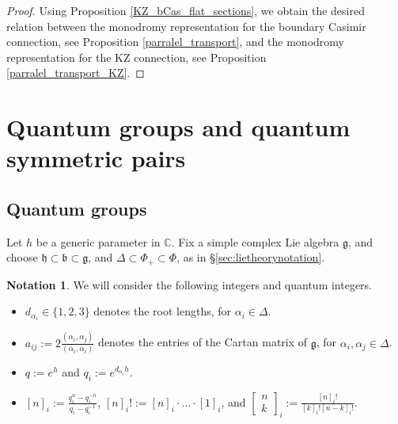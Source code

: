 \documentclass[10pt]{amsart}
\numberwithin{equation}{section}
\theoremstyle{definition}
\newtheorem{notation}[theorem]{Notation}
\def\C{{\mathbb C}}
\newcommand{\qbinom}[2]{\begin{bmatrix} #1 \\ #2 \end{bmatrix}}
\newcommand{\g}{\mathfrak{g}}
\newcommand{\h}{\mathfrak{h}}
\begin{document}
\begin{proof}
    Using Proposition \ref{KZ_bCas_flat_sections}, we obtain the desired relation between the monodromy representation for the boundary Casimir connection, see Proposition \ref{parralel_transport}, and the monodromy representation for the KZ connection, see Proposition \ref{parralel_transport_KZ}.
\end{proof}


\section{Quantum groups and quantum symmetric pairs}\label{sec4}
\subsection{Quantum groups}

Let $h$ be a generic parameter in $\C$. Fix a simple complex Lie algebra $\g$, and choose $\h\subset \mathfrak{b}\subset \g$, and $\Delta \subset \Phi_+\subset \Phi$, as in \S \ref{sec:lietheorynotation}. 
\begin{notation}\label{not:quantumintegernotation}
We will consider the following integers and quantum integers.
\begin{itemize}
    \item $d_{\alpha_i}\in \{1, 2, 3\}$ denotes the root lengths, for $\alpha_i\in \Delta$.
    \item $a_{ij}:=2\frac{(\alpha_i,\alpha_j)}{(\alpha_i,\alpha_i)}$ denotes the entries of the Cartan matrix of $\mathfrak{g}$, for $\alpha_i,\alpha_j\in \Delta$.
    \item $q:=e^h$ and $q_i:=e^{d_{\alpha_i}h}$.
    \item $[n]_i:=\frac{q^n_i-q^{-n}_i}{q_i-q^{-1}_i}$, 
    $[n]_i!:=[n]_i \cdot \dots \cdot [1]_i$, and $\qbinom{n}{k}_i:=\frac{[n]_i!}{[k]_i! [n-k]_i!}$.
\end{itemize} 
\end{notation}
\end{document}
